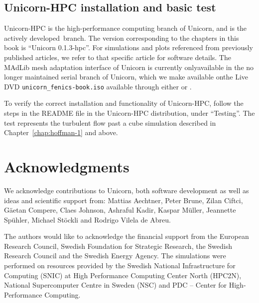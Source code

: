 \subsection{Unicorn-HPC installation and basic test}

Unicorn-HPC is the high-performance computing branch of Unicorn, and
is the actively devel\-oped~branch. The version corresponding to the
chapters in this book is ``Unicorn 0.1.3-hpc''. For simulations and
plots referenced from previously published articles, we refer to that
specific article for software details. The MAdLib mesh adaptation
interface of Unicorn is currently only\break available in the no longer
maintained serial branch of Unicorn, which we make available on\break the Live DVD {\tt unicorn\_fenics-book.iso} available through either 
or .

To verify the correct installation and functionality of Unicorn-HPC,
follow the steps in the README file in the Unicorn-HPC distribution,
under ``Testing''. The test represents the turbulent flow past a cube
simulation described in Chapter~\ref{chap:hoffman-1} and above.

\section{Acknowledgments}

We acknowledge contributions to Unicorn, both software development as
well as ideas and scientific support from: Mattias Aechtner, Peter
Brune, Zilan Ciftci, G\"aetan Compere, Claes Johnson, Ashraful Kadir,
Kaspar M\"uller, Jeannette Sp\"uhler, Michael St\"ockli and Rodrigo
Vilela de Abreu.

The authors would like to acknowledge the financial support from the
European Research Council, Swedish Foundation for Strategic Research,
the Swedish Research Council and the Swedish Energy Agency. The
simulations were performed on resources provided by the Swedish
National Infrastructure for Computing (SNIC) at High Performance
Computing Center North (HPC2N), National Supercomputer Centre in
Sweden (NSC) and PDC -- Center for High-Performance Computing.

\processqueries

\endgroup

